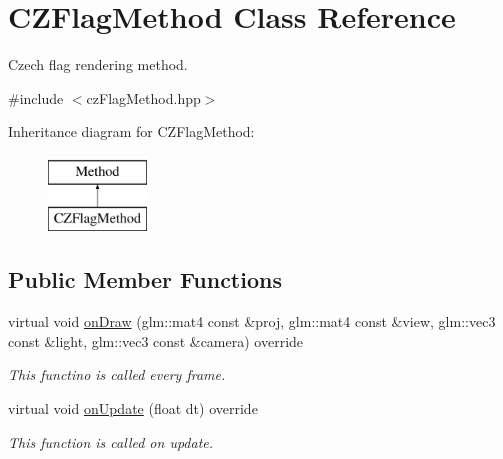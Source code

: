 \hypertarget{classCZFlagMethod}{}\section{C\+Z\+Flag\+Method Class Reference}
\label{classCZFlagMethod}


Czech flag rendering method.  




{\ttfamily \#include $<$cz\+Flag\+Method.\+hpp$>$}

Inheritance diagram for C\+Z\+Flag\+Method\+:\begin{figure}[H]
\begin{center}
\leavevmode
\includegraphics[height=2.000000cm]{classCZFlagMethod}
\end{center}
\end{figure}
\subsection*{Public Member Functions}
\begin{DoxyCompactItemize}
\item 
virtual void \hyperlink{classCZFlagMethod_a72425a172b48b3f730b9b8c7745cc70a}{on\+Draw} (glm\+::mat4 const \&proj, glm\+::mat4 const \&view, glm\+::vec3 const \&light, glm\+::vec3 const \&camera) override
\begin{DoxyCompactList}\small\item\em This functino is called every frame. \end{DoxyCompactList}\item 
virtual void \hyperlink{classCZFlagMethod_a337cf1158aca2ecf975fee2631071411}{on\+Update} (float dt) override
\begin{DoxyCompactList}\small\item\em This function is called on update. \end{DoxyCompactList}\end{DoxyCompactItemize}
